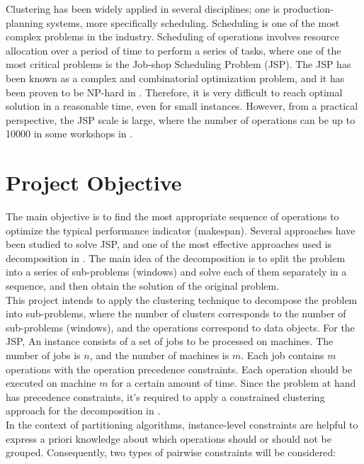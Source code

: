 \documentclass{article}
\begin{document}
Clustering has been widely applied in several disciplines; one is production-planning systems, more specifically scheduling. Scheduling is one of the most complex problems in the industry. Scheduling of operations involves resource allocation over a period of time to perform a series of tasks, where one of the most critical problems is the Job-shop Scheduling Problem (JSP). The JSP has been known as a complex and combinatorial optimization problem, and it has been proven to be NP-hard in \cite{baker1974introduction,lenstra1979computational}. Therefore, it is very difficult to reach optimal solution in a reasonable time, even for small instances. However, from a practical perspective, the JSP scale is large, where the number of operations can be up to 10000 in some workshops in \cite{zhang2010hybrid}. \\

\section{Project Objective}
The main objective is to find the most appropriate sequence of operations to optimize the typical performance indicator (makespan). Several approaches have been studied to solve JSP, and one of the most effective approaches used is decomposition in \cite{zhang2010hybrid,zhai2014decomposition}. The main idea of the decomposition is to split the problem into a series of sub-problems (windows) and solve each of them separately in a sequence, and then obtain the solution of the original problem. \\

This project intends to apply the clustering technique to decompose the problem into sub-problems, where the number of clusters corresponds to the number of sub-problems (windows), and the operations correspond to data objects. For the JSP, An instance consists of a set of jobs to be processed on machines. The number of jobs is $n$, and the number of machines is $m$. Each job contains $m$ operations with the operation precedence constraints. Each operation should be executed on machine $m$ for a certain amount of time. Since the problem at hand has precedence constraints, it’s required to apply a constrained clustering approach for the decomposition in \cite{wagstaff2001constrained}. \\

In the context of partitioning algorithms, instance-level constraints are helpful to express a priori knowledge about which operations should or should not be grouped. Consequently, two types of pairwise constraints will be considered:
\end{document}
